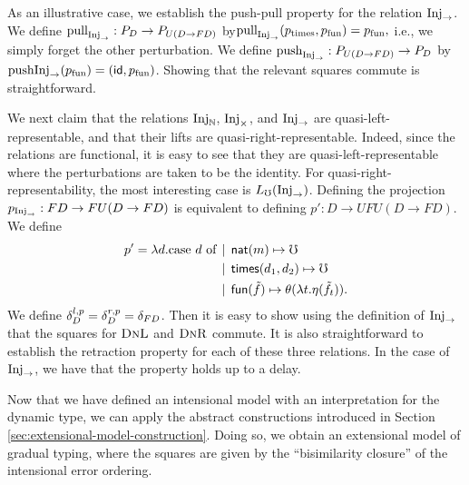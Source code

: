 As an illustrative case, we establish the push-pull property for the relation $\text{Inj}_\to$.
We define $\text{pull}_{\text{Inj}_\to} : P_D \to P_{U(D \to FD)}$ by\( \text{pull}_{\text{Inj}_\to}(p_{\text{times}}, p_{\text{fun}}) = p_{\text{fun}}, \)
%
i.e., we simply forget the other perturbation.
%
We define $\text{push}_{\text{Inj}_\to} : P_{U(D \to FD)} \to P_D$ by \( \text{push}{\text{Inj}_\to}(p_{\text{fun}}) = (\mathsf{id}, p_{\text{fun}}) \).
%
Showing that the relevant squares commute is straightforward.
%


We next claim that the relations $\text{Inj}_\mathbb{N}$, $\text{Inj}_\times$, and $\text{Inj}_\to$ are quasi-left-representable,
and that their lifts are quasi-right-representable.
Indeed, since the relations are functional, it is easy to see that they are quasi-left-representable
where the perturbations are taken to be the identity.
%
For quasi-right-representability, the most interesting case is $L_\mho(\text{Inj}_\to)$.
Defining the projection $p_{\text{Inj}_\to} : FD \to FU(D \to FD)$ is equivalent to defining
$p' : D \to UFU(D \to FD)$. We define
\begin{align*}
 p' = \lambda d.\text{case $d$ of}   &\mathrel{\bf \,\mid\,} \mathsf{nat}(m) \mapsto \mho \\
    &\mathrel{\bf \,\mid\,} \mathsf{times}(d_1, d_2) \mapsto \mho \\
    &\mathrel{\bf \,\mid\,} \mathsf{fun}(\tilde{f}) \mapsto \theta (\lambda t. \eta(\tilde{f}_t)).
\end{align*}
%
We define $\delta^{l,p}_D = \delta^{r,p}_D = \delta_{FD}$.
Then it is easy to show using the definition of $\text{Inj}_\to$ that the squares for $\textsc{DnL}$ and $\textsc{DnR}$ commute.
%
It is also straightforward to establish the retraction property for
each of these three relations. In the case of $\text{Inj}_\to$, we
have that the property holds up to a delay.


Now that we have defined an intensional model with an interpretation for the dynamic type, we can apply
the abstract constructions introduced in Section \ref{sec:extensional-model-construction}.
Doing so, we obtain an extensional model of gradual typing, where the squares are given by the
``bisimilarity closure'' of the intensional error ordering.

